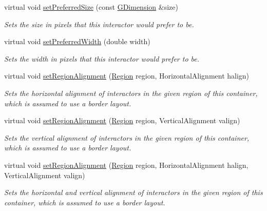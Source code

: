 \begin{DoxyCompactItemize}
virtual void \mbox{\hyperlink{classGInteractor_aa22d9be4bc0e078bb0ea69b0fc9d7c75}{set\+Preferred\+Size}} (const \mbox{\hyperlink{structGDimension}{G\+Dimension}} \&size)
\begin{DoxyCompactList}\small\item\em Sets the size in pixels that this interactor would prefer to be. \end{DoxyCompactList}\item 
virtual void \mbox{\hyperlink{classGInteractor_a3db429ab2fa52efd187eec0ed8cdd9f2}{set\+Preferred\+Width}} (double width)
\begin{DoxyCompactList}\small\item\em Sets the width in pixels that this interactor would prefer to be. \end{DoxyCompactList}\item 
virtual void \mbox{\hyperlink{classGContainer_a96e9f5593c0193bbdc7ae99945b9cf5f}{set\+Region\+Alignment}} (\mbox{\hyperlink{classGContainer_a81a01a86de31071a92e6cce0bab9bc4b}{Region}} region, Horizontal\+Alignment halign)
\begin{DoxyCompactList}\small\item\em Sets the horizontal alignment of interactors in the given region of this container, which is assumed to use a border layout. \end{DoxyCompactList}\item 
virtual void \mbox{\hyperlink{classGContainer_a926942899d029fc9921fe770ac2867bb}{set\+Region\+Alignment}} (\mbox{\hyperlink{classGContainer_a81a01a86de31071a92e6cce0bab9bc4b}{Region}} region, Vertical\+Alignment valign)
\begin{DoxyCompactList}\small\item\em Sets the vertical alignment of interactors in the given region of this container, which is assumed to use a border layout. \end{DoxyCompactList}\item 
virtual void \mbox{\hyperlink{classGContainer_ab4d2bfcca7a18da2847e7b4494da4a16}{set\+Region\+Alignment}} (\mbox{\hyperlink{classGContainer_a81a01a86de31071a92e6cce0bab9bc4b}{Region}} region, Horizontal\+Alignment halign, Vertical\+Alignment valign)
\begin{DoxyCompactList}\small\item\em Sets the horizontal and vertical alignment of interactors in the given region of this container, which is assumed to use a border layout. \end{DoxyCompactList}\item 

\end{DoxyCompactItemize}
